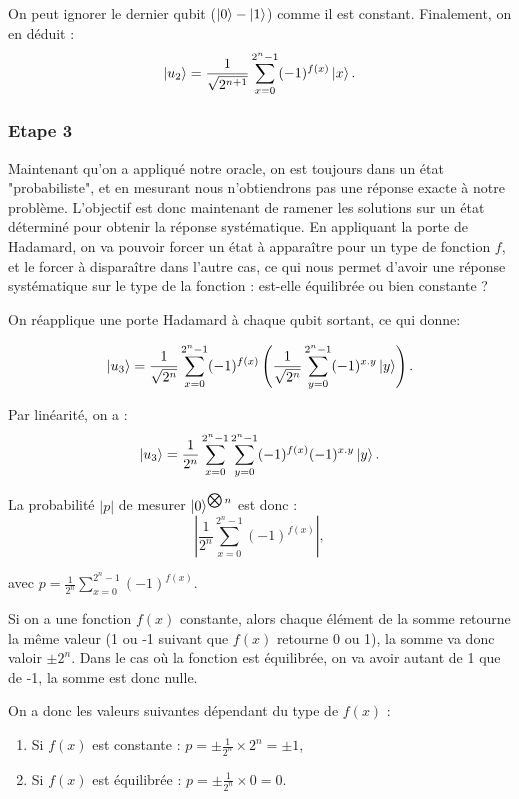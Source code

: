 On peut ignorer le dernier qubit ($\ket{0} - \ket{1}$) comme il est
constant. Finalement, on en déduit :
\begin{equation}
\ket{u_2} = \frac{1}{\sqrt{2^{n + 1}}}
\displaystyle\sum_{x=0}^{2^n-1} (-1)^{f(x)}\ket{x}.
\end{equation}

\subsubsection{Etape 3}

Maintenant qu'on a appliqué notre oracle, on est toujours dans un état
"probabiliste", et en mesurant nous n'obtiendrons pas une réponse
exacte à notre problème. L'objectif est donc maintenant de ramener les
solutions sur un état déterminé pour obtenir la réponse
systématique. En appliquant la porte de Hadamard, on va pouvoir forcer
un état à apparaître pour un type de fonction $f$, et le forcer à
disparaître dans l'autre cas, ce qui nous permet d'avoir une réponse
systématique sur le type de la fonction : est-elle équilibrée ou bien constante ?

On réapplique une porte Hadamard à chaque qubit sortant, ce qui donne:

\[ 
  \ket{u_3} = \frac{1}{\sqrt{2^{n}}}
\displaystyle\sum_{x=0}^{2^n-1} (-1)^{f(x)} \left( \frac{1}{\sqrt{2^{n}}} \displaystyle\sum_{y=0}^{2^n-1} (-1)^{x.y}\ket{y} \right) .
\]

Par linéarité, on a :
\begin{equation}
  \label{eq:1}
  \ket{u_3} = \frac{1}{2^{n}}
  \displaystyle\sum_{x=0}^{2^n-1} \displaystyle\sum_{y=0}^{2^n-1}(-1)^{f(x)} (-1)^{x.y}\ket{y}  .
\end{equation}

La probabilité $|p|$ de mesurer $\ket{0}^{\bigotimes n}$ est donc : 
\begin{equation}
  \label{eq:2}
  |\frac{1}{2^{n}}\displaystyle\sum_{x=0}^{2^n-1}(-1)^{f(x)}|,
\end{equation}

avec $p = \frac{1}{2^{n}}\displaystyle\sum_{x=0}^{2^n-1}(-1)^{f(x)}$.

Si on a une fonction $f(x)$ constante, alors chaque élément de la
somme retourne la même valeur (1 ou -1 suivant que $f(x)$ retourne 0
ou 1), la somme va donc valoir $\pm 2^{n}$. Dans le cas où la fonction
est équilibrée, on va avoir autant de 1 que de -1, la somme est donc
nulle.

On a donc les valeurs suivantes dépendant du type de $f(x)$ :
\begin{enumerate}
  \item Si $f(x)$ est constante :  $p = \pm \frac{1}{2^n} \times 2^{n} = \pm 1$,
  \item Si $f(x)$ est équilibrée : $p = \pm \frac{1}{2^n} \times 0 = 0$.
\end{enumerate}

